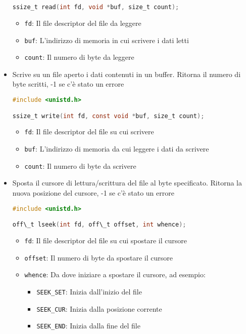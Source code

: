 \documentclass[a4paper]{article}
\begin{document}
\begin{itemize}
\begin{lstlisting}[language=C]
ssize_t read(int fd, void *buf, size_t count);
  \end{lstlisting}
  \begin{itemize}
    \item \texttt{fd}: Il file descriptor del file da leggere
    \item \texttt{buf}: L'indirizzo di memoria in cui scrivere i dati letti
    \item \texttt{count}: Il numero di byte da leggere
  \end{itemize}

\item Scrive su un file aperto i dati contenuti in un buffer. Ritorna il numero di
  byte scritti, -1 se c'è stato un errore
  \begin{lstlisting}[language=C]
#include <unistd.h>

ssize_t write(int fd, const void *buf, size_t count);
  \end{lstlisting}
  \begin{itemize}
    \item \texttt{fd}: Il file descriptor del file su cui scrivere
    \item \texttt{buf}: L'indirizzo di memoria da cui leggere i dati da scrivere
    \item \texttt{count}: Il numero di byte da scrivere
  \end{itemize}

\item Sposta il cursore di lettura/scrittura del file al byte specificato. Ritorna
  la nuova posizione del cursore, -1 se c'è stato un errore
  \begin{lstlisting}[language=C]
#include <unistd.h>

off\_t lseek(int fd, off\_t offset, int whence);
  \end{lstlisting}
  \begin{itemize}
    \item \texttt{fd}: Il file descriptor del file su cui spostare il cursore
    \item \texttt{offset}: Il numero di byte da spostare il cursore
    \item \texttt{whence}: Da dove iniziare a spostare il cursore, ad esempio:
      \begin{itemize}
        \item \texttt{SEEK\_SET}: Inizia dall'inizio del file
        \item \texttt{SEEK\_CUR}: Inizia dalla posizione corrente
        \item \texttt{SEEK\_END}: Inizia dalla fine del file
      \end{itemize}
  \end{itemize}


\end{itemize}
\end{document}
